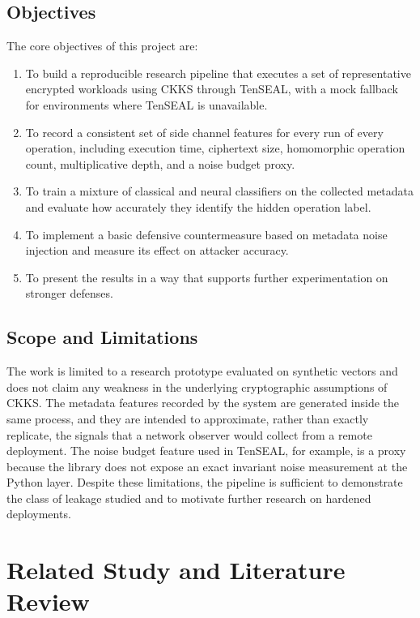 \documentclass[12pt,a4paper]{article}
\begin{document}
\subsection{Objectives}
The core objectives of this project are:
\begin{enumerate}[leftmargin=*]
  \item To build a reproducible research pipeline that executes a set of representative encrypted workloads using CKKS through TenSEAL, with a mock fallback for environments where TenSEAL is unavailable.
  \item To record a consistent set of side channel features for every run of every operation, including execution time, ciphertext size, homomorphic operation count, multiplicative depth, and a noise budget proxy.
  \item To train a mixture of classical and neural classifiers on the collected metadata and evaluate how accurately they identify the hidden operation label.
  \item To implement a basic defensive countermeasure based on metadata noise injection and measure its effect on attacker accuracy.
  \item To present the results in a way that supports further experimentation on stronger defenses.
\end{enumerate}

\subsection{Scope and Limitations}
The work is limited to a research prototype evaluated on synthetic vectors and does not claim any weakness in the underlying cryptographic assumptions of CKKS. The metadata features recorded by the system are generated inside the same process, and they are intended to approximate, rather than exactly replicate, the signals that a network observer would collect from a remote deployment. The noise budget feature used in TenSEAL, for example, is a proxy because the library does not expose an exact invariant noise measurement at the Python layer. Despite these limitations, the pipeline is sufficient to demonstrate the class of leakage studied and to motivate further research on hardened deployments.

\section{Related Study and Literature Review}
\end{document}
